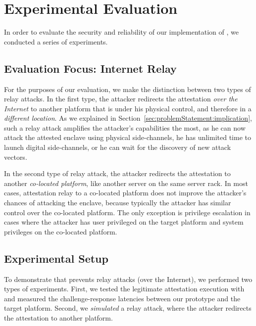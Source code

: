 \section{Experimental Evaluation}
\label{sec:evaluation}

In order to evaluate the security and reliability of our implementation of \name, we conducted a series of experiments.

\subsection{Evaluation Focus: Internet Relay}
\label{sec:evaluation:focus}

For the purposes of our evaluation, we make the distinction between two types of relay attacks. In the first type, the attacker redirects the attestation \emph{over the Internet} to another platform that is under his physical control, and therefore in a \emph{different location}. As we explained in Section~\ref{sec:problemStatement:implication}, such a relay attack amplifies the attacker's capabilities the most, as he can now attack the attested enclave using physical side-channels, he has unlimited time to launch digital side-channels, or he can wait for the discovery of new attack vectors. 
 
In the second type of relay attack, the attacker redirects the attestation to another \emph{co-located platform}, like another server on the same server rack. In most cases, attestation relay to a co-located platform does not improve the attacker's chances of attacking the enclave, because typically the attacker has similar control over the co-located platform. The only exception is privilege escalation in cases where the attacker has user privileged on the target platform and system privileges on the co-located platform. 



\subsection{Experimental Setup}
\label{sec:evaluation:exp}

To demonstrate that \name prevents relay attacks (over the Internet), we performed two types of experiments. First, we tested the legitimate attestation execution with \name and measured the challenge-response latencies between our prototype and the target platform. Second, we \emph{simulated} a relay attack, where the attacker redirects the attestation to another platform.

